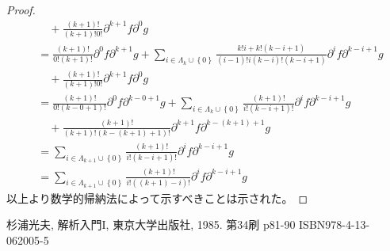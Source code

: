 \documentclass[dvipdfmx]{jsarticle}
\begin{document}
\begin{proof}
\begin{align*}
&\quad + \frac{(k + 1)!}{(k + 1)!0!}\partial^{k + 1}f\partial^{0}g\\
&= \frac{(k + 1)!}{0!(k + 1)!}\partial^{0}f\partial^{k + 1}g + \sum_{i \in \varLambda_{k} \cup \left\{ 0 \right\}} {\frac{k!i + k!(k - i + 1)}{(i - 1)!i(k - i)!(k - i + 1)}\partial^{i}f\partial^{k - i + 1}g} \\
&\quad + \frac{(k + 1)!}{(k + 1)!0!}\partial^{k + 1}f\partial^{0}g\\
&= \frac{(k + 1)!}{0!(k - 0 + 1)!}\partial^{0}f\partial^{k - 0 + 1}g + \sum_{i \in \varLambda_{k} \cup \left\{ 0 \right\}} {\frac{(k + 1)!}{i!(k - i + 1)!}\partial^{i}f\partial^{k - i + 1}g} \\
&\quad + \frac{(k + 1)!}{(k + 1)!\left( k - (k + 1) + 1 \right)!}\partial^{k + 1}f\partial^{k - (k + 1) + 1}g\\
&= \sum_{i \in \varLambda_{k + 1} \cup \left\{ 0 \right\}} {\frac{(k + 1)!}{i!(k - i + 1)!}\partial^{i}f\partial^{k - i + 1}g}\\
&= \sum_{i \in \varLambda_{k + 1} \cup \left\{ 0 \right\}} {\frac{(k + 1)!}{i!\left( (k + 1) - i \right)!}\partial^{i}f\partial^{k - i + 1}g}
\end{align*}
以上より数学的帰納法によって示すべきことは示された。
\end{proof}
\begin{thebibliography}{50}
  杉浦光夫, 解析入門I, 東京大学出版社, 1985. 第34刷 p81-90 ISBN978-4-13-062005-5
\end{thebibliography}
\end{document}
